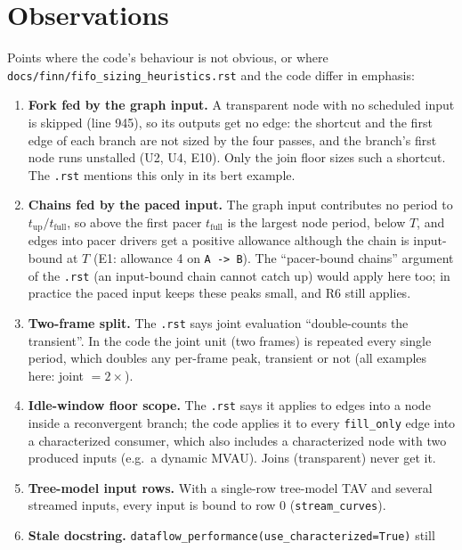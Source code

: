 \documentclass[10pt,a4paper]{article}
\newcommand{\code}[1]{\texttt{#1}}
\newcommand{\Tg}{T}           %
\begin{document}
\section{Observations}\label{sec:obs}

Points where the code's behaviour is not obvious, or where
\code{docs/finn/fifo\_sizing\_heuristics.rst} and the code differ in emphasis:
\begin{enumerate}
\item \textbf{Fork fed by the graph input.} A transparent node with no scheduled input
  is skipped (line 945), so its outputs get no edge: the shortcut and the first edge of
  each branch are not sized by the four passes, and the branch's first node runs
  unstalled (U2, U4, E10). Only the join floor sizes such a shortcut. The \code{.rst}
  mentions this only in its bert example.
\item \textbf{Chains fed by the paced input.} The graph input contributes no period
  to $t_{\mathrm{up}}/t_{\mathrm{full}}$, so above the first pacer $t_{\mathrm{full}}$ is the
  largest node period, below $\Tg$, and edges into pacer drivers get a positive allowance
  although the chain is input-bound at $\Tg$ (E1: allowance 4 on \code{A -> B}). The
  ``pacer-bound chains'' argument of the \code{.rst} (an input-bound chain cannot catch up)
  would apply here too; in practice the paced input keeps these peaks small, and R6 still
  applies.
\item \textbf{Two-frame split.} The \code{.rst} says joint evaluation ``double-counts the
  transient''. In the code the joint unit (two frames) is repeated every single period,
  which doubles any per-frame peak, transient or not (all examples here: joint $=2\times$).
\item \textbf{Idle-window floor scope.} The \code{.rst} says it applies to edges into a node
  inside a reconvergent branch; the code applies it to every \code{fill\_only} edge into a
  characterized consumer, which also includes a characterized node with two produced inputs
  (e.g.\ a dynamic MVAU). Joins (transparent) never get it.
\item \textbf{Tree-model input rows.} With a single-row tree-model TAV and several
  streamed inputs, every input is bound to row 0 (\code{stream\_curves}).
\item \textbf{Stale docstring.} \code{dataflow\_performance(use\_characterized=True)} still

\end{enumerate}
\end{document}
